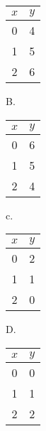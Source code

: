 \begin{center}
\begin{tabular}{|c|c|}
\hline
$x$ & $y$ \\
\hline
0 & 4 \\
\hline
1 & 5 \\
\hline
2 & 6 \\
\hline
\end{tabular}
\end{center}

B.

\begin{center}
\begin{tabular}{|c|c|}
\hline
$x$ & $y$ \\
\hline
0 & 6 \\
\hline
1 & 5 \\
\hline
2 & 4 \\
\hline
\end{tabular}
\end{center}

c.

\begin{center}
\begin{tabular}{|c|c|}
\hline
$x$ & $y$ \\
\hline
0 & 2 \\
\hline
1 & 1 \\
\hline
2 & 0 \\
\hline
\end{tabular}
\end{center}

D.

\begin{center}
\begin{tabular}{|c|c|}
\hline
$x$ & $y$ \\
\hline
0 & 0 \\
\hline
1 & 1 \\
\hline
2 & 2 \\
\hline
\end{tabular}
\end{center}

































